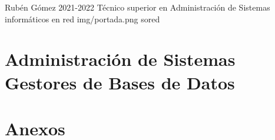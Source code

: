 \documentclass{../../../yukibook.cls/yukibook}
\begin{document}
    {Rubén Gómez}  %
    {2021-2022}    %
    {Técnico superior en Administración de \linebreak Sistemas informáticos en red} %
    {}	%
    {}	%
    {img/portada.png} %
    {sored} %

    \part{Administración de Sistemas Gestores de Bases de Datos}
    \graphicspath{{img/sgbd/}}
    

    \part{Anexos}

    \graphicspath{{../../../anexos/instalar_ubuntu_lts/}}
    

%    
%
%    
%
%    
%
%    
%
%    
%
    \graphicspath{{../../../anexos/}}
    
\end{document}
